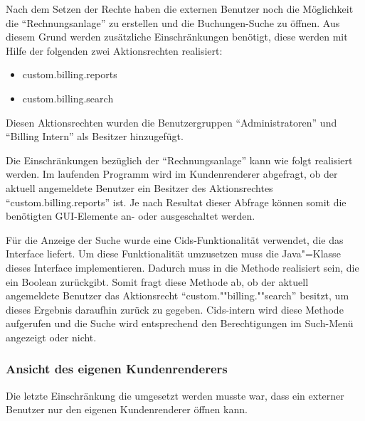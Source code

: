 Nach dem Setzen der Rechte haben die externen Benutzer noch die Möglichkeit die \enquote{Rechnungsanlage} zu erstellen und die Buchungen-Suche zu öffnen.
Aus diesem Grund werden zusätzliche Einschränkungen benötigt, diese werden mit Hilfe der folgenden zwei Aktionsrechten realisiert:
\begin{itemize}
\item custom.billing.reports
\item custom.billing.search
\end{itemize}
Diesen Aktionsrechten wurden die Benutzergruppen "`Administratoren"' und "`Billing Intern"' als Besitzer hinzugefügt.

Die Einschränkungen bezüglich der \enquote{Rechnungsanlage} kann wie folgt realisiert werden.
Im laufenden Programm wird im Kundenrenderer abgefragt, ob der aktuell angemeldete Benutzer ein Besitzer des Aktionsrechtes "`custom.billing.reports"' ist.
Je nach Resultat dieser Abfrage können somit die benötigten GUI-Elemente an- oder ausgeschaltet werden.

Für die Anzeige der Suche wurde eine Cids-Funktionalität verwendet, die das Interface  liefert.
Um diese Funktionalität umzusetzen muss die Java"=Klasse  dieses Interface implementieren.
Dadurch muss in  die Methode  realisiert sein, die ein Boolean zurückgibt.
Somit fragt diese Methode ab, ob der aktuell angemeldete Benutzer das Aktionsrecht "`custom.""billing.""search"' besitzt, um dieses Ergebnis daraufhin zurück zu gegeben.
Cids-intern wird diese Methode aufgerufen und die Suche wird entsprechend den Berechtigungen im Such-Menü angezeigt oder nicht. 

\subsubsection{Ansicht des eigenen Kundenrenderers}
Die letzte Einschränkung die umgesetzt werden musste war, dass ein externer Benutzer nur den eigenen Kundenrenderer öffnen kann.

